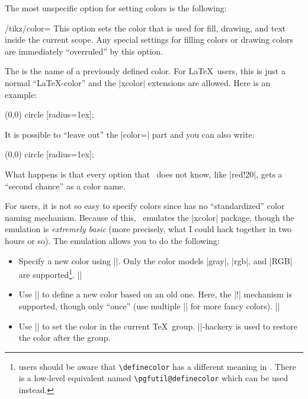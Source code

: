 The most unspecific option for setting colors is the following:
%
\begin{key}{/tikz/color=}
    This option sets the color that is used for fill, drawing, and text inside
    the current scope. Any special settings for filling colors or drawing
    colors are immediately ``overruled'' by this option.

    The  is the name of a previously defined color. For
    \LaTeX\ users, this is just a normal ``\LaTeX-color'' and the |xcolor|
    extensions are allowed. Here is an example:
\begin{codeexample}[]
\tikz \fill[color=red!20] (0,0) circle [radius=1ex];
\end{codeexample}

    It is possible to ``leave out'' the |color=| part and you can also write:
\begin{codeexample}[]
\tikz \fill[red!20] (0,0) circle [radius=1ex];
\end{codeexample}
    What happens is that every option that \tikzname\ does not know, like
    |red!20|, gets a ``second chance'' as a color name.

    For  users, it is not so easy to specify colors since
     has no ``standardized'' color naming mechanism. Because of this,
    \pgfname\ emulates the |xcolor| package, though the emulation is
    \emph{extremely basic} (more precisely, what I could hack together in two
    hours or so). The emulation allows you to do the following:
    \begin{itemize}
        \item Specify a new color using |\definecolor|. Only the color models
            |gray|, |rgb|, and |RGB| are supported\footnote{ users
            should be aware that \texttt{\textbackslash definecolor} has a
            different meaning in . There is a low-level equivalent
            named \texttt{\textbackslash pgfutil@definecolor} which can be
            used instead.}.
            \example ||
        \item Use || to define a new color based on an old one.
            Here, the |!| mechanism is supported, though only ``once'' (use
            multiple || for more fancy colors).
            \example ||
        \item Use |\color| to set the color in the current
            \TeX\ group. |\aftergroup|-hackery is used to restore the color
            after the group.
    \end{itemize}
\end{key}

